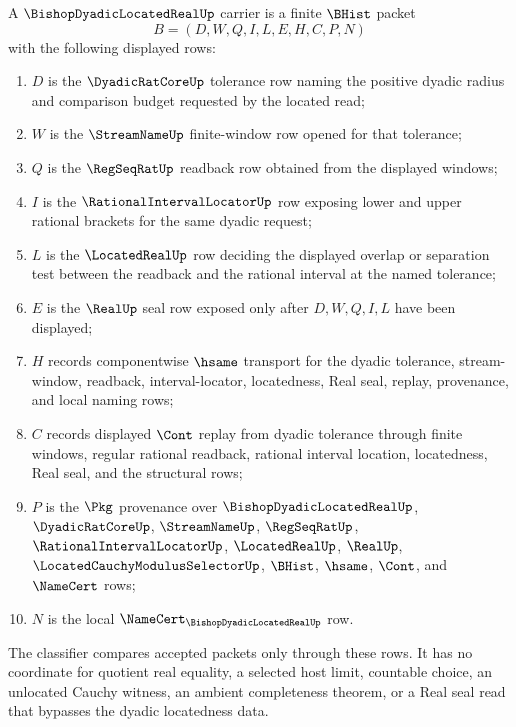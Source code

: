 \begin{definition}
\label{def:bishop-dyadic-located-real-carrier}
A $\BishopDyadicLocatedRealUp$ carrier is a finite $\BHist$ packet
$$
B=(D,W,Q,I,L,E,H,C,P,N)
$$
with the following displayed rows:
\begin{enumerate}
\item $D$ is the $\DyadicRatCoreUp$ tolerance row naming the positive dyadic radius and comparison budget requested by the located read;
\item $W$ is the $\StreamNameUp$ finite-window row opened for that tolerance;
\item $Q$ is the $\RegSeqRatUp$ readback row obtained from the displayed windows;
\item $I$ is the $\RationalIntervalLocatorUp$ row exposing lower and upper rational brackets for the same dyadic request;
\item $L$ is the $\LocatedRealUp$ row deciding the displayed overlap or separation test between the readback and the rational interval at the named tolerance;
\item $E$ is the $\RealUp$ seal row exposed only after $D,W,Q,I,L$ have been displayed;
\item $H$ records componentwise $\hsame$ transport for the dyadic tolerance, stream-window, readback, interval-locator, locatedness, Real seal, replay, provenance, and local naming rows;
\item $C$ records displayed $\Cont$ replay from dyadic tolerance through finite windows, regular rational readback, rational interval location, locatedness, Real seal, and the structural rows;
\item $P$ is the $\Pkg$ provenance over $\BishopDyadicLocatedRealUp$, $\DyadicRatCoreUp$, $\StreamNameUp$, $\RegSeqRatUp$, $\RationalIntervalLocatorUp$, $\LocatedRealUp$, $\RealUp$, $\LocatedCauchyModulusSelectorUp$, $\BHist$, $\hsame$, $\Cont$, and $\NameCert$ rows;
\item $N$ is the local $\NameCert_{\BishopDyadicLocatedRealUp}$ row.
\end{enumerate}
The classifier compares accepted packets only through these rows. It has no coordinate for quotient real equality, a selected host limit, countable choice, an unlocated Cauchy witness, an ambient completeness theorem, or a Real seal read that bypasses the dyadic locatedness data.
\end{definition}

